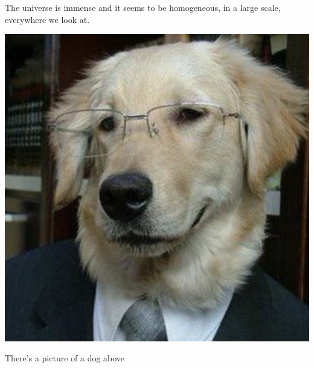 \documentclass{article}
\begin{document}
The universe is immense and it seems to be homogeneous, 
in a large scale, everywhere we look at.

\includegraphics{business-dog.png}

There's a picture of a dog above
\end{document}
